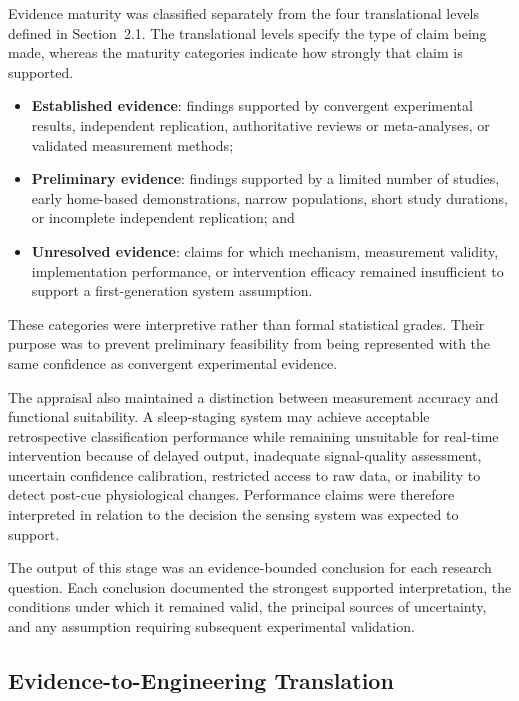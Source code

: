 Evidence maturity was classified separately from the four translational levels
defined in Section~2.1. The translational levels specify the type of claim being
made, whereas the maturity categories indicate how strongly that claim is
supported.

\begin{itemize}
    \item \textbf{Established evidence}: findings supported by convergent
    experimental results, independent replication, authoritative reviews or
    meta-analyses, or validated measurement methods;

    \item \textbf{Preliminary evidence}: findings supported by a limited number
    of studies, early home-based demonstrations, narrow populations, short
    study durations, or incomplete independent replication; and

    \item \textbf{Unresolved evidence}: claims for which mechanism,
    measurement validity, implementation performance, or intervention efficacy
    remained insufficient to support a first-generation system assumption.
\end{itemize}

These categories were interpretive rather than formal statistical grades. Their
purpose was to prevent preliminary feasibility from being represented with the
same confidence as convergent experimental evidence.

The appraisal also maintained a distinction between measurement accuracy and
functional suitability. A sleep-staging system may achieve acceptable
retrospective classification performance while remaining unsuitable for
real-time intervention because of delayed output, inadequate signal-quality
assessment, uncertain confidence calibration, restricted access to raw data, or
inability to detect post-cue physiological changes. Performance claims were
therefore interpreted in relation to the decision the sensing system was
expected to support.

The output of this stage was an evidence-bounded conclusion for each research
question. Each conclusion documented the strongest supported interpretation,
the conditions under which it remained valid, the principal sources of
uncertainty, and any assumption requiring subsequent experimental validation.


\subsection{Evidence-to-Engineering Translation}

